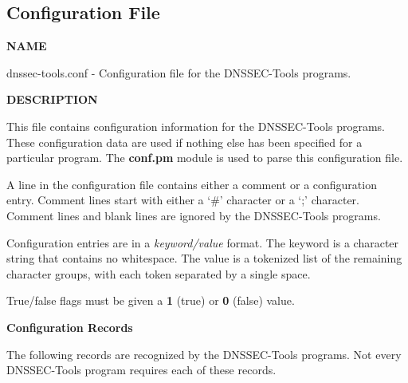 \clearpage

\subsection{ Configuration File}


{\bf NAME}

dnssec-tools.conf - Configuration file for the DNSSEC-Tools programs.

{\bf DESCRIPTION}

This file contains configuration information for the DNSSEC-Tools programs.
These configuration data are used if nothing else has been specified for a
particular program.  The {\bf conf.pm} module is used to parse this
configuration file.

A line in the configuration file contains either a comment or a configuration
entry.  Comment lines start with either a `\#' character or a `;' character.
Comment lines and blank lines are ignored by the DNSSEC-Tools programs.

Configuration entries are in a {\it keyword/value} format.  The keyword is a
character string that contains no whitespace.  The value is a tokenized list
of the remaining character groups, with each token separated by a single space.

True/false flags must be given a {\bf 1} (true) or {\bf 0} (false) value.

{\bf Configuration Records}

The following records are recognized by the DNSSEC-Tools programs.
Not every DNSSEC-Tools program requires each of these records.

